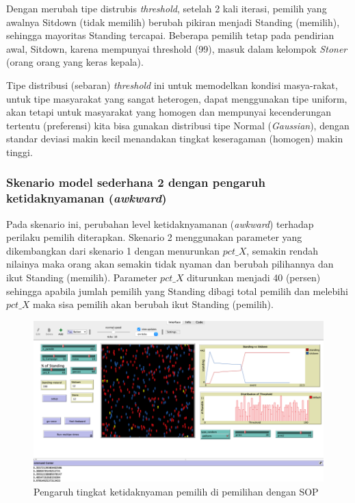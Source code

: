 Dengan merubah tipe distrubis \textit{threshold}, setelah 2 kali iterasi, pemilih yang awalnya Sitdown (tidak memilih) berubah pikiran menjadi Standing (memilih), sehingga mayoritas Standing tercapai. Beberapa pemilih tetap pada pendirian awal, Sitdown, karena mempunyai threshold (99), masuk dalam kelompok \textit{Stoner} (orang orang yang keras kepala).

Tipe distribusi (sebaran) \textit{threshold} ini untuk memodelkan kondisi masya-rakat, untuk tipe masyarakat yang sangat heterogen, dapat menggunakan tipe uniform, akan tetapi untuk masyarakat yang homogen dan mempunyai kecenderungan tertentu (preferensi) kita bisa gunakan distribusi tipe Normal (\textit{Gaussian}), dengan standar deviasi makin kecil menandakan tingkat keseragaman (homogen) makin tinggi.

\subsubsection{Skenario model sederhana 2 dengan pengaruh ketidaknyamanan (\textit{awkward})}

Pada skenario ini, perubahan level ketidaknyamanan (\textit{awkward}) terhadap perilaku pemilih diterapkan. Skenario 2 menggunakan parameter yang dikembangkan dari skenario 1 dengan menurunkan $pct\_X$, semakin rendah nilainya maka orang akan semakin tidak nyaman dan berubah pilihannya dan ikut Standing (memilih). Parameter $pct\_X$ diturunkan menjadi 40 (persen) sehingga apabila jumlah pemilih yang Standing dibagi total pemilih dan melebihi $pct\_X$ maka sisa pemilih akan berubah ikut Standing (pemilih).

\begin{figure}[H]
\centering
\includegraphics[width=\linewidth]{images/ch03/pemilusop4}
\caption{Pengaruh tingkat ketidaknyaman pemilih di pemilihan dengan SOP}
\label{fig:pemilusop4}
\end{figure}

